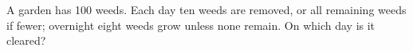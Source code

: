 A garden has 100 weeds. Each day ten weeds are removed, or all remaining weeds if fewer; overnight eight weeds grow unless none remain. On which day is it cleared?
